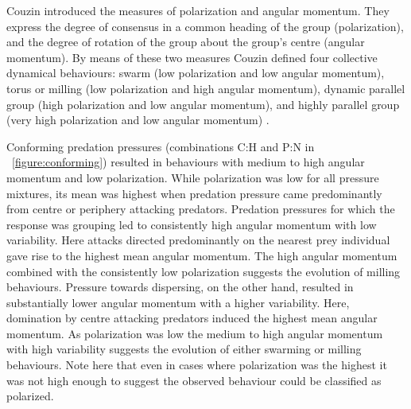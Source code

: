 Couzin\etal \cite{couzin2002collective} introduced the measures of polarization and angular momentum. They express the degree of consensus in a common heading of the group (polarization), and the degree of rotation of the group about the group's centre (angular momentum). By means of these two measures Couzin\etal \cite{couzin2002collective} defined four collective dynamical behaviours: swarm (low polarization and low angular momentum), torus or milling (low polarization and high angular momentum), dynamic parallel group (high polarization and low angular momentum), and highly parallel group (very high polarization and low angular momentum) \cite{couzin2002collective}. 

Conforming predation pressures (combinations C:H and P:N in \figurename~\ref{figure:conforming}) resulted in behaviours with medium to high angular momentum and low polarization. While polarization was low for all pressure mixtures, its mean was highest when predation pressure came predominantly from centre or periphery attacking predators. Predation pressures for which the response was grouping led to consistently high angular momentum with low variability. Here attacks directed predominantly on the nearest prey individual gave rise to the highest mean angular momentum. The high angular momentum combined with the consistently low polarization suggests the evolution of milling behaviours. Pressure towards dispersing, on the other hand, resulted in substantially lower angular momentum with a higher variability. Here, domination by centre attacking predators induced the highest mean angular momentum. As polarization was low the medium to high angular momentum with high variability suggests the evolution of either swarming or milling behaviours. Note here that even in cases where polarization was the highest it was not high enough to suggest the observed behaviour could be classified as polarized.


